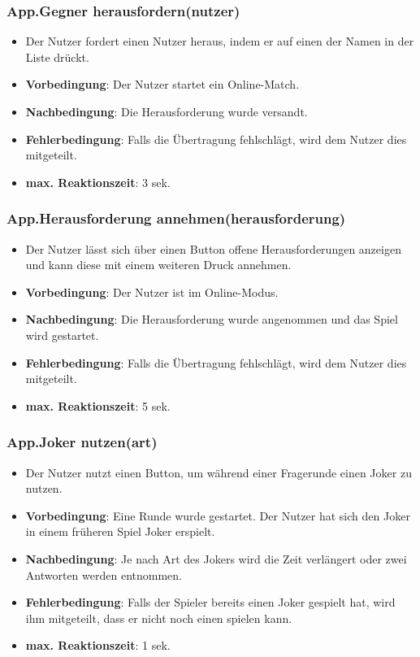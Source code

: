 \documentclass[fontsize=12pt,paper=a4,twoside]{scrartcl}
\begin{document}
\subsubsection{App.Gegner herausfordern(nutzer)}
\begin{itemize}
\item Der Nutzer fordert einen Nutzer heraus, indem er auf einen der Namen in der Liste drückt. 
\item \textbf{Vorbedingung}: Der Nutzer startet ein Online-Match.
\item \textbf{Nachbedingung}: Die Herausforderung wurde versandt.
\item \textbf{Fehlerbedingung}: Falls die Übertragung fehlschlägt, wird dem Nutzer dies mitgeteilt.
\item \textbf{max. Reaktionszeit}: 3 sek.
\end{itemize}

\subsubsection{App.Herausforderung annehmen(herausforderung)}
\begin{itemize}
\item Der Nutzer lässt sich über einen Button offene Herausforderungen anzeigen und kann diese mit einem weiteren Druck annehmen. 
\item \textbf{Vorbedingung}: Der Nutzer ist im Online-Modus.
\item \textbf{Nachbedingung}: Die Herausforderung wurde angenommen und das Spiel wird gestartet.
\item \textbf{Fehlerbedingung}: Falls die Übertragung fehlschlägt, wird dem Nutzer dies mitgeteilt.
\item \textbf{max. Reaktionszeit}: 5 sek.
\end{itemize}

\subsubsection{App.Joker nutzen(art)}
\begin{itemize}
\item Der Nutzer nutzt einen Button, um während einer Fragerunde einen Joker zu nutzen.
\item \textbf{Vorbedingung}: Eine Runde wurde gestartet. Der Nutzer hat sich den Joker in einem früheren Spiel Joker erspielt.
\item \textbf{Nachbedingung}: Je nach Art des Jokers wird die Zeit verlängert oder zwei Antworten werden entnommen. 
\item \textbf{Fehlerbedingung}: Falls der Spieler bereits einen Joker gespielt hat, wird ihm mitgeteilt, dass er nicht noch einen spielen kann.
\item \textbf{max. Reaktionszeit}: 1 sek.
\end{itemize}
\end{document}

